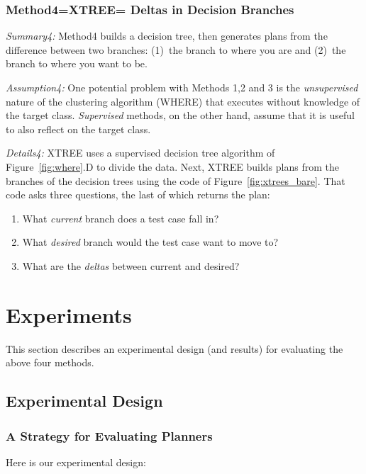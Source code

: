 \documentclass{sig-alternate}
\newcommand{\be}{\begin{enumerate}}
\newcommand{\ee}{\end{enumerate}}
\newcommand{\fig}[1]{Figure~\ref{fig:#1}}
\begin{document}
%




\subsubsection{Method4=XTREE=  Deltas in Decision Branches}

{\em Summary4:} Method4 builds a decision tree,  then generates
plans from the difference between two branches:
(1)~the branch to where you are and (2)~the branch to where you want to be.

{\em Assumption4:} One potential problem with Methods 1,2 and 3 is the {\em unsupervised} nature of
the clustering algorithm (WHERE) that  
executes without knowledge of the target class.  {\em Supervised} methods, on the other hand, assume that it is useful to also reflect on the target class.

{\em Details4:} 
XTREE uses a supervised   decision tree algorithm of \fig{where}.D to divide the data.
Next, XTREE builds plans from the branches of the decision trees using the code of \fig{xtrees_bare}.
That code asks three questions, the last of which returns the plan:
\be
\item
What {\em current} branch does a test case fall in?
\item What {\em desired} branch would the test case want to move to?
\item What are the {\em deltas} between current and desired? 
\ee

\section{Experiments}

  
 

This section describes an experimental design (and results) for evaluating the above four methods. 
\subsection{Experimental Design}

\subsubsection{A Strategy for Evaluating Planners}
 
 Here is our experimental design:
 
\end{document}
